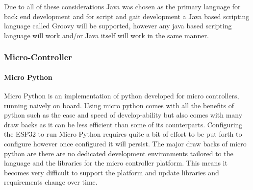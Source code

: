 \documentclass[conference]{IEEEtran}
\begin{document}
Due to all of these considerations Java was chosen as the primary language for back end development and for script and gait development a Java based scripting language called Groovy will be supported, however any java based scripting language will work and/or Java itself will work in the same manner. \newline

\subsubsection*{Micro-Controller}
\paragraph*{Micro Python}
    Micro Python is an implementation of python developed for micro controllers, running naively on board. Using micro python comes with all the benefits of python such as the ease and speed of develop-ability but also comes with many draw backs as it can be less efficient than some of its counterparts. Configuring the ESP32 to run Micro Python requires quite a bit of effort to be put forth to configure however once configured it will persist. The major draw backs of micro python are there are no dedicated development environments tailored to the language and the libraries for the micro controller platform. This means it becomes very difficult to support the platform and update libraries and requirements change over time.
\end{document}
